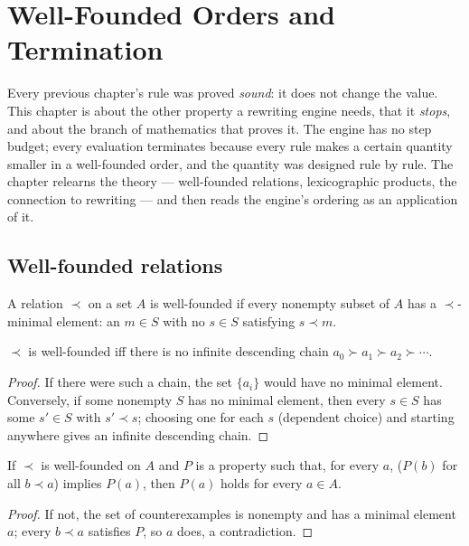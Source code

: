 \chapter{Well-Founded Orders and Termination}\label{ch:wf}

Every previous chapter's rule was proved \emph{sound}: it does not change the value. This chapter
is about the other property a rewriting engine needs, that it \emph{stops}, and about the branch
of mathematics that proves it. The engine has no step budget; every evaluation terminates because
every rule makes a certain quantity smaller in a well-founded order, and the quantity was designed
rule by rule. The chapter relearns the theory --- well-founded relations, lexicographic products,
the connection to rewriting --- and then reads the engine's ordering as an application of it.

\section{Well-founded relations}

\begin{definition}
  A relation $\prec$ on a set $A$ is well-founded if every nonempty subset of $A$ has a
  $\prec$-minimal element: an $m \in S$ with no $s \in S$ satisfying $s \prec m$.
\end{definition}

\begin{theorem}
  $\prec$ is well-founded iff there is no infinite descending chain
  $a_0 \succ a_1 \succ a_2 \succ \cdots$.
\end{theorem}
\begin{proof}
  If there were such a chain, the set $\{a_i\}$ would have no minimal element. Conversely, if
  some nonempty $S$ has no minimal element, then every $s \in S$ has some $s' \in S$ with
  $s' \prec s$; choosing one for each $s$ (dependent choice) and starting anywhere gives an
  infinite descending chain.
\end{proof}

\begin{theorem}
  If $\prec$ is well-founded on $A$ and $P$ is a property such that, for every $a$,
  ($P(b)$ for all $b \prec a$) implies $P(a)$, then $P(a)$ holds for every $a \in A$.
\end{theorem}
\begin{proof}
  If not, the set of counterexamples is nonempty and has a minimal element $a$; every $b \prec a$
  satisfies $P$, so $a$ does, a contradiction.
\end{proof}

